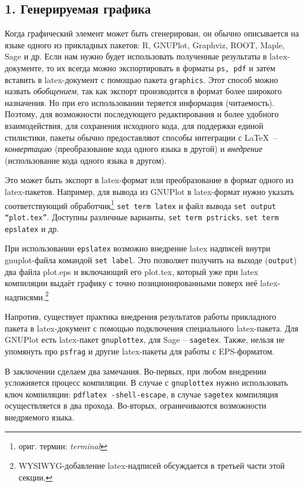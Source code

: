 \documentclass[10pt, a5paper]{article}
\begin{document}
\subsection*{1. Генерируемая графика}

Когда графический элемент может быть сгенерирован, он обычно описывается на языке одного из 
прикладных пакетов: R, GNUPlot, Graphviz, ROOT, Maple, Sage и др. 
Если нам нужно будет использовать полученные результаты в latex-документе, то 
их всегда можно экспортировать в форматы \texttt{ps, pdf} и
затем вставить в latex-документ с помощью пакета \texttt{graphics}.
Этот способ можно назвать \textit{обобщением}, так как экспорт производится в формат более широкого назначения. 
Но при его использовании теряется информация (читаемость). 
Поэтому, для возможности последующего редактирования и более удобного взаимодействия, 
для сохранения исходного кода, для поддержки единой стилистики,
пакеты обычно предоставляют способы интеграции с \LaTeX \,
-- \textit{конвертацию} (преобразование кода одного языка в другой) и \textit{внедрение} 
(использование кода одного языка в другом).

Это может быть экспорт в latex-формат или преобразование в формат одного из latex-пакетов.
Например, для вывода из GNUPlot в latex-формат нужно указать соответствующий обработчик\footnote{ориг. термин: \textit{terminal}}  
\texttt{set term latex} и файл вывода \texttt{set output ``plot.tex''}. 
Доступны различные варианты, \texttt{set term pstricks}, \texttt{set term epslatex} и др.

При использовании \texttt{epslatex} возможно внедрение latex надписей внутри gnuplot-файла командой 
\texttt{set label}. Это позволяет получить на выходе (\texttt{output}) два файла 
plot.eps и включающий его plot.tex, который уже при latex компиляции выдаёт графику с точно 
позиционированными поверх неё latex-надписями.\footnote{WYSIWYG-добавление latex-надписей обсуждается 
в третьей части этой секции.}     

Напротив, существует практика внедрения результатов работы прикладного пакета в latex-документ
с помощью подключения специального latex-пакета. Для GNUPlot есть latex-пакет \texttt{gnuplottex},
для Sage -- \texttt{sagetex}. Также, нельзя не упомянуть про \texttt{psfrag} и другие latex-пакеты для
работы с EPS-форматом.    

В заключении сделаем два замечания. 
Во-первых, при любом внедрении усложняется процесс компиляции. 
В случае с \texttt{gnuplottex} нужно использовать ключ компиляции: \texttt{pdflatex -shell-escape}, 
в случае \texttt{sagetex} компиляция осуществляется в два прохода. 
Во-вторых, ограничиваются возможности внедряемого языка. 
\end{document}
